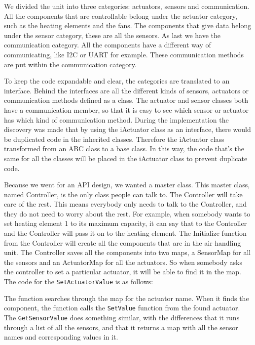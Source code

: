 \documentclass[a4paper,oneside]{book}
\begin{document}
We divided the unit into three categories: actuators, sensors and
communication. All the components that are controllable belong under the
actuator category, such as the heating elements and the fans. The components
that give data belong under the sensor category, these are all the sensors. As
last we have the communication category. All the components have a different
way of communicating, like I2C or UART for example. These communication methods
are put within the communication category.

To keep the code expandable and clear, the categories are translated to an
interface. Behind the interfaces are all the different kinds of sensors,
actuators or communication methods defined as a class. The actuator and sensor
classes both have a communication member, so that it is easy to see which
sensor or actuator has which kind of communication method. During the
implementation the discovery was made that by using the iActuator class as an
interface, there would be duplicated code in the inherited classes. Therefore
the iActuator class transformed from an ABC class to a base class. In this way,
the code that's the same for all the classes will be placed in the iActuator
class to prevent duplicate code.

Because we went for an API design, we wanted a master class. This master class,
named Controller, is the only class people can talk to. The Controller will
take care of the rest. This means everybody only needs to talk to the
Controller, and they do not need to worry about the rest. For example, when
somebody wants to set heating element 1 to its maximum capacity, it can say
that to the Controller and the Controller will pass it on to the heating
element.  The Initialize function from the Controller will create all the
components that are in the air handling unit. The Controller saves all the
components into two maps, a SensorMap for all the sensors and an ActuatorMap
for all the actuators. So when somebody asks the controller to set a particular
actuator, it will be able to find it in the map. The code for the
\lstinline|SetActuatorValue| is as follows:



The function searches through the map for the actuator name. When it finds the
component, the function calls the \lstinline|SetValue| function from the found
actuator. The \lstinline|GetSensorValue| does something similar, with the
differences that it runs through a list of all the sensors, and that it returns
a map with all the sensor names and corresponding values in it.
\end{document}

